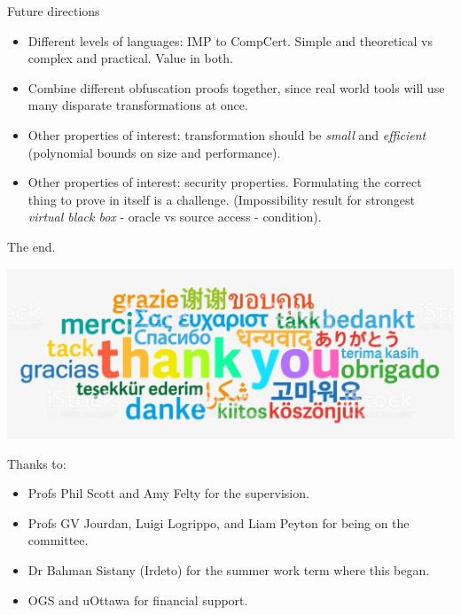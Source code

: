 \documentclass[10pt,handout]{beamer}
\theoremstyle{plain}
\theoremstyle{definition}
\begin{document}
\begin{frame}{Future directions}
    \begin{itemize}
        \item Different levels of languages: IMP to CompCert.  Simple and theoretical vs complex and practical.  Value in both.
        \item Combine different obfuscation proofs together, since real world tools will use many disparate transformations at once.
        \item Other properties of interest: transformation should be \emph{small} and \emph{efficient} (polynomial bounds on size and performance).
        \item Other properties of interest: security properties.  Formulating the correct thing to prove in itself is a challenge.  (Impossibility result for strongest \emph{virtual black box} - oracle vs source access - condition).
    \end{itemize}
\end{frame}

\begin{frame}{The end.}
\begin{center}\medskip
\includegraphics[]{thanks}
\end{center}
Thanks to:
\begin{itemize}
\item Profs Phil Scott and Amy Felty for the supervision.
\item Profs GV Jourdan, Luigi Logrippo, and Liam Peyton for being on the committee.
\item Dr Bahman Sistany (Irdeto) for the summer work term where this began.
\item OGS and uOttawa for financial support.
\end{itemize}
\end{frame}
\end{document}
